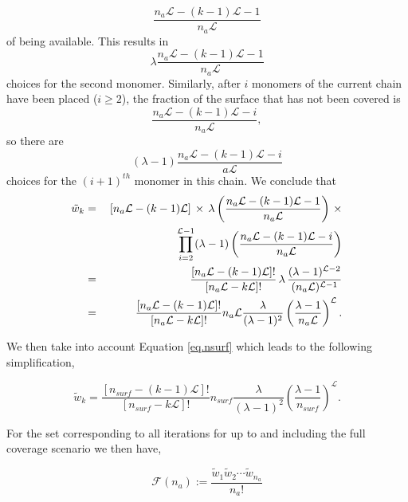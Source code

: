 \documentclass[12pt,letterpaper]{article}
\newcommand{\leng}{\mathcal{L}}
\newcommand{\fop}{\ensuremath{\mathcal{F}}}
\begin{document}
$$
\frac{n_a\leng-(k-1)\leng-1}{n_a\leng}
$$
of being available.  
This results in
$$
\lambda
\frac{
    n_a
    \leng
    -
    (k-1)
    \leng
    -
    1
}{
    n_a
    \leng
}
$$
choices for the second monomer. Similarly, after $i$ monomers of the current chain have been placed ($i\geq 2$), the fraction of the surface that has not been covered is
$$
\frac{n_a\leng-(k-1)\leng-i}{n_a\leng},
$$
so there are
$$
(
\lambda
-1
)
\frac{
n_a
\leng
-
(k-1)
\leng
-
i
}{
a\leng
}
$$
choices for the $(i+1)^{th}$ monomer in this chain. We conclude that 
\begin{eqnarray}
   \tilde{w}_k  & = &   [n_a\leng-(k-1)\leng]\,\times \,\lambda\left(\frac{ n_a\leng-(k-1)\leng-1}{n_a\leng}\right)    \,\times
   \nonumber    \\
   & &    \hspace{22mm}
     \prod_{i=2}^{\leng-1}(\lambda-1)\left(\frac{ n_a\leng-(k-1)\leng-i}{n_a\leng}\right)  
      \nonumber \\
 & = &    \frac{[n_a\leng-(k-1)\leng]!}{[n_a\leng-k\leng]!} \,\lambda\,  \frac{(\lambda-1)^{\leng-2}}{(n_a\leng)^{\leng-1}}  
     \nonumber    \\
     & = &    \frac{[n_a\leng-(k-1)\leng]!}{[n_a\leng-k\leng]!}   n_a\leng \frac{\lambda}{(\lambda-1)^2}\left(  \frac{\lambda-1}{n_a\leng}\right)^{\leng}.
     \label{eq.wk2supp}
\end{eqnarray}

We then take into account Equation \ref{eq.nsurf} which leads to the following simplification,

\begin{equation}
   \tilde{w}_k 
   =
   \frac{
        [
            n_{surf}
            -
            (
                    k
                -
                1
            )
                \leng
        ]
        !
   }{
        [
            n_{surf}
            -
        k
        \leng
        ]
        !
   }   
    n_{surf}
   \frac{
        \lambda
   }{
        (\lambda-1)^2
   }
   \left(
        \frac{
            \lambda
            -
            1
        }{
            n_{surf}
        }
    \right)
    ^{
            \leng
    }.
    \label{wk2supp}
\end{equation}

For the set corresponding to all iterations for up to and including the full coverage scenario we then have, 


\begin{equation}
    \fop(n_a) 
    :=      
    \frac{
        \tilde{w}_1
        \tilde{w}_2
        \cdots 
        \tilde{w}_{n_a}
    }{
        n_a!
    }
    \label{Gofna}
\end{equation}
\end{document}
